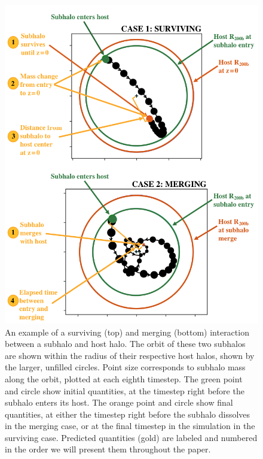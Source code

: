 \documentclass[fleqn,usenatbib]{mnras}
\begin{document}
\begin{figure}
	\includegraphics[width=\columnwidth]{Figures/explanatory_figures}
	\vspace{-15pt}
    \caption{An example of a surviving (top) and merging (bottom) interaction between a subhalo and host halo. The orbit of these two subhalos are shown within the radius of their respective host halos, shown by the larger, unfilled circles. Point size corresponds to subhalo mass along the orbit, plotted at each eighth timestep. The green point and circle show initial quantities, at the timestep right before the subhalo enters its host. The orange point and circle show final quantities, at either the timestep right before the subhalo dissolves in the merging case, or at the final timestep in the simulation in the surviving case. Predicted quantities (gold) are labeled and numbered in the order we will present them throughout the paper.}
    \label{fig:explanatory_figures}
\end{figure}
\end{document}
